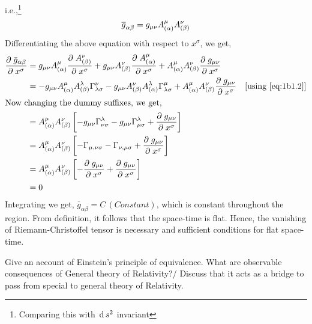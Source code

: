 \documentclass[../main-sheet.tex]{subfiles}
\begin{document}
\begin{soln}
            i.e.,\footnote{Comparing this with \(\,\mathrm{d}\, s^2\) invariant}
            \begin{equation}
                \overline{g}_{\alpha\beta}=g_{{\mu\nu}} A_{(\alpha)}^\mu A_{(\beta)}^\nu\label{eq:1b.3}
            \end{equation}
            Differentiating the above equation with respect to \(x^\sigma\), we get,
            \begin{align*}
                \frac{\partial\;\bar{g}_{\alpha\beta}}{\partial\; x^\sigma} &= g_{{\mu\nu}} A_{(\alpha)}^\mu\frac{\partial\;A_{(\beta)}^\nu}{\partial\; x^\sigma}+g_{{\mu\nu}}A_{(\beta)}^\nu\frac{\partial\;A_{(\alpha)}^\mu}{\partial\; x^\sigma}+A_{(\alpha)}^\mu A_{(\beta)}^\nu \frac{\partial\;g_{{\mu\nu}}}{\partial\; x^\sigma}\\
                &=-g_{{\mu\nu}} A_{(\alpha)}^\mu A_{(\beta)}^\lambda \Gamma_{\lambda\sigma}^\nu - g_{{\mu\nu}} A_{(\beta)}^\nu A_{(\alpha)}^\lambda \Gamma_{\lambda\sigma}^\mu+A_{(\alpha)}^\mu A_{(\beta)}^\nu \frac{\partial\;g_{\mu\nu}}{\partial\; x^\sigma}\quad[\text{using \eqref{eq:1b1.2}}]
                \\
                \intertext{Now changing the dummy suffixes, we get,}
                &=A_{(\alpha)}^\mu A_{(\beta)}^\nu \left[-g_{{\mu\nu}} \Gamma_{\nu\sigma}^\lambda-g_{{\mu\nu}} \Gamma_{\mu\sigma}^\lambda+\frac{\partial\;g_{\mu\nu}}{\partial\; x^\sigma}\right]\\
                &=A_{(\alpha)}^\mu A_{(\beta)}^\nu \left[-\Gamma_{\mu,\nu\sigma}-\Gamma_{\nu,\mu\sigma}+\frac{\partial\;g_{\mu\nu}}{\partial\; x^\sigma}\right]\\
                &=A_{(\alpha)}^\mu A_{(\beta)}^\nu \left[-\frac{\partial\;g_{\mu\nu}}{\partial\; x^\sigma}+\frac{\partial\;g_{\mu\nu}}{\partial\; x^\sigma}\right]\\
                &=0
            \end{align*}
            Integrating we get, \(\overline{g}_{\alpha\beta}=C\,(Constant)\), which is constant throughout the region. From definition, it follows that the space-time is flat. Hence, the vanishing of Riemann-Christoffel tensor is necessary and sufficient conditions for flat space-time.
        \end{soln}
        \begin{prob}[6]
            Give an account of Einstein's principle of equivalence. What are observable consequences of General theory of Relativity?/ Discuss that it acts as a bridge to pass from special to general theory of Relativity.
        \end{prob}
\end{document}
